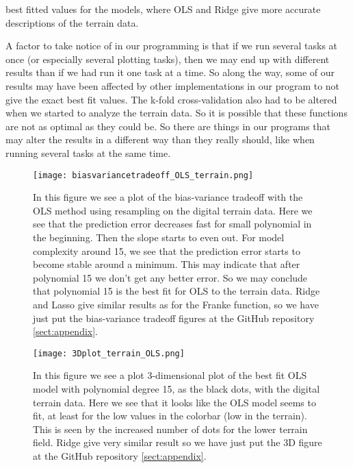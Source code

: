 \documentclass[12pt,a4paper,english]{article}
\begin{document}
best fitted values for the models, where OLS and Ridge give more accurate descriptions of the terrain data.

A factor to take notice of in our programming is that if we run several tasks at once (or especially several plotting tasks), then we may end up with different results than if we had run it one task at a time. So along the way, some of our results may have been affected by other implementations in our program to not give the exact best fit values. The k-fold cross-validation also had to be altered when we started to analyze the terrain data. So it is possible that these functions are not as optimal as they could be. So there are things in our programs that may alter the results in a different way than they really should, like when running several tasks at the same time.

\begin{figure}[htbp]
	\centering\texttt{[image: biasvariancetradeoff\_OLS\_terrain.png]}
	\caption{In this figure we see a plot of the bias-variance tradeoff with the OLS method using resampling on the digital terrain data. Here we see that the prediction error decreases fast for small polynomial in the beginning. Then the slope starts to even out. For model complexity around 15, we see that the prediction error starts to become stable around a minimum. This may indicate that after polynomial 15 we don't get any better error. So we may conclude that polynomial 15 is the best fit for OLS to the terrain data. Ridge and Lasso give similar results as for the Franke function, so we have just put the bias-variance tradeoff figures at the GitHub repository \ref{sect:appendix}. \label{fig:biasvar_OLS_terrain}}
\end{figure}

\begin{figure}[htbp]
	\centering\texttt{[image: 3Dplot\_terrain\_OLS.png]}
	\caption{In this figure we see a plot 3-dimensional plot of the best fit OLS model with polynomial degree 15, as the black dots, with the digital terrain data. Here we see that it looks like the OLS model seems to fit, at least for the low values in the colorbar (low in the terrain). This is seen by the increased number of dots for the lower terrain field. Ridge give very similar result so we have just put the 3D figure at the GitHub repository \ref{sect:appendix}. \label{fig:3d_best_OLS_terrain}}
\end{figure}
\end{document}

